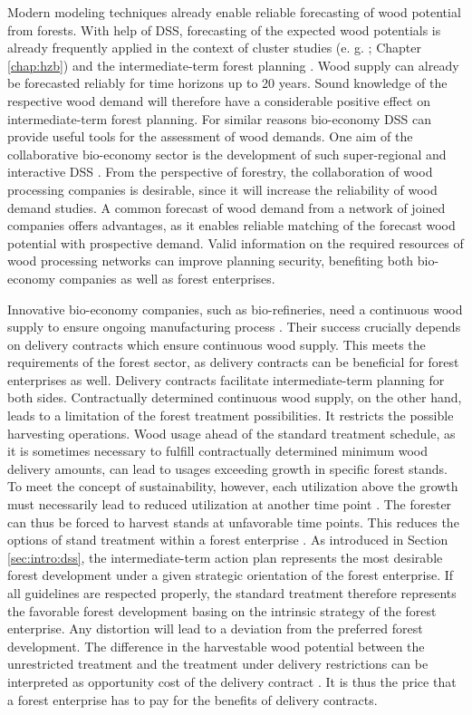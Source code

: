Modern modeling techniques already enable reliable forecasting of wood potential from forests. With help of DSS, forecasting of the expected wood potentials is already frequently applied in the context of cluster studies (e. g. \citealp{bmel_2016}; Chapter \ref{chap:hzb}) and the intermediate-term forest planning \citep[e.g.][]{bockmann_2004}. Wood supply can already be forecasted reliably for time horizons up to 20 years. Sound knowledge of the respective wood demand will therefore have a considerable positive effect on intermediate-term forest planning. For similar reasons bio-economy DSS can provide useful tools for the assessment of wood demands. One aim of the collaborative bio-economy sector is the development of such super-regional and interactive DSS \citep[p. 362]{ollikainen_2014}. From the perspective of forestry, the collaboration of wood processing companies is desirable, since it will increase the reliability of wood demand studies. A common forecast of wood demand from a network of joined companies offers advantages, as it enables reliable matching of the forecast wood potential with prospective demand. Valid information on the required resources of wood processing networks can improve planning security, benefiting both bio-economy companies as well as forest enterprises.

Innovative bio-economy companies, such as bio-refineries, need a continuous wood supply to ensure ongoing manufacturing process \citep[p. 362]{ollikainen_2014}. Their success crucially depends on delivery contracts which ensure continuous wood supply. This meets the requirements of the forest sector, as delivery contracts can be beneficial for forest enterprises as well. Delivery contracts facilitate intermediate-term planning for both sides. Contractually determined continuous wood supply, on the other hand, leads to a limitation of the forest treatment possibilities. It restricts the possible harvesting operations. Wood usage ahead of the standard treatment schedule, as it is sometimes necessary to fulfill contractually determined minimum wood delivery amounts, can lead to usages exceeding growth in specific forest stands. To meet the concept of sustainability, however, each utilization above the growth must necessarily lead to reduced utilization at another time point \citep[p. 67]{mohring_1997}. The forester can thus be forced to harvest stands at unfavorable time points. This reduces the options of stand treatment within a forest enterprise \citep[p. 351-352]{mohring_2010}. As introduced in Section \ref{sec:intro:dss}, the intermediate-term action plan represents the most desirable forest development under a given strategic orientation of the forest enterprise. If all guidelines are respected properly, the standard treatment therefore represents the favorable forest development basing on the intrinsic strategy of the forest enterprise. Any distortion will lead to a deviation from the preferred forest development. The difference in the harvestable wood potential between the unrestricted treatment and the treatment under delivery restrictions can be interpreted as opportunity cost of the delivery contract \citep[p. 353]{mohring_2010}. It is thus the price that a forest enterprise has to pay for the benefits of delivery contracts.

